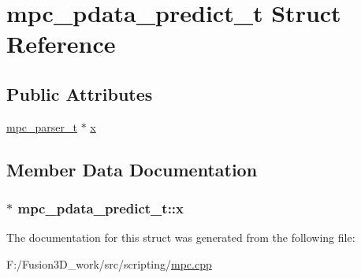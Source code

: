 \hypertarget{structmpc__pdata__predict__t}{}\section{mpc\+\_\+pdata\+\_\+predict\+\_\+t Struct Reference}
\label{structmpc__pdata__predict__t}
\subsection*{Public Attributes}
\begin{DoxyCompactItemize}
\item 
\hyperlink{structmpc__parser__t}{mpc\+\_\+parser\+\_\+t} $\ast$ \hyperlink{structmpc__pdata__predict__t_ab450a72bb82d9be41765c502747469b0}{x}
\end{DoxyCompactItemize}


\subsection{Member Data Documentation}
\hypertarget{structmpc__pdata__predict__t_ab450a72bb82d9be41765c502747469b0}{}
\subsubsection[{x}]{$\ast$ mpc\+\_\+pdata\+\_\+predict\+\_\+t\+::x}\label{structmpc__pdata__predict__t_ab450a72bb82d9be41765c502747469b0}


The documentation for this struct was generated from the following file\+:\begin{DoxyCompactItemize}
\item 
F\+:/\+Fusion3\+D\+\_\+work/src/scripting/\hyperlink{mpc_8cpp}{mpc.\+cpp}\end{DoxyCompactItemize}
